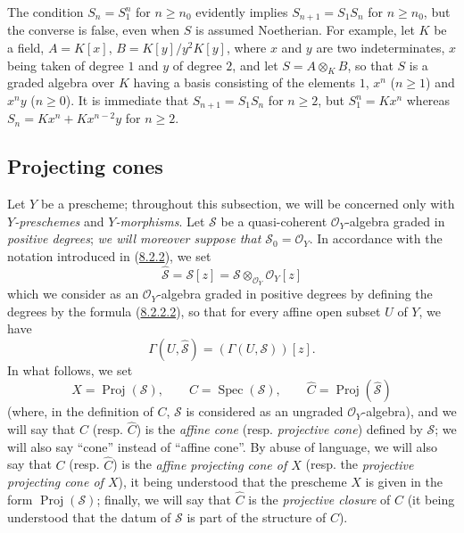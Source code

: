 \begin{remark}[8.2.15]
\label{II.8.2.15}
The condition $S_n=S_1^n$ for $n\geq n_0$ evidently implies
$S_{n+1}=S_1S_n$ for $n\geq n_0$, but the converse is false, even
when $S$ is assumed Noetherian. For example, let $K$ be a field,
$A=K[x]$, $B=K[y]/y^2K[y]$, where $x$ and $y$ are two indeterminates, $x$ being
taken of degree $1$ and $y$ of degree $2$, and let $S=A\otimes_KB$, so that
$S$ is a graded algebra over $K$ having a basis consisting of the elements $1$,
$x^n$ ($n\geq1$) and $x^ny$ ($n\geq0$). It is immediate that
$S_{n+1}=S_1S_n$ for $n\geq2$, but $S_1^n=Kx^n$ whereas
$S_n=Kx^n+Kx^{n-2}y$ for $n\geq2$.
\end{remark}

\subsection{Projecting cones}
\label{subsection:II.8.3}

\begin{env}[8.3.1]
\label{II.8.3.1}
Let $Y$ be a prescheme; throughout this subsection, we will be concerned only
with \emph{$Y$-preschemes} and \emph{$Y$-morphisms}. Let $\mathcal{S}$ be a
quasi-coherent $\mathcal{O}_Y$-algebra graded in \emph{positive degrees};
\emph{we will moreover suppose that $\mathcal{S}_0=\mathcal{O}_Y$}.
In accordance with the notation introduced in
(\hyperref[II.8.2.2]{8.2.2}), we set
\begin{equation}
\label{II.8.3.1.1}
  \widehat{\mathcal{S}}=\mathcal{S}[z]
  =\mathcal{S}\otimes_{\mathcal{O}_Y}\mathcal{O}_Y[z]
\tag{8.3.1.1}
\end{equation}
which we consider as an $\mathcal{O}_Y$-algebra graded in positive degrees by
defining the degrees by the formula
(\hyperref[II.8.2.2.2]{8.2.2.2}), so that for every affine open subset $U$
of $Y$, we have
\[
  \Gamma(U,\widehat{\mathcal{S}})=(\Gamma(U,\mathcal{S}))[z].
\]
In what follows, we set
\begin{equation}
\label{II.8.3.1.2}
  X=\operatorname{Proj}(\mathcal{S}),\qquad
  C=\operatorname{Spec}(\mathcal{S}),\qquad
  \widehat{C}=\operatorname{Proj}(\widehat{\mathcal{S}})
\tag{8.3.1.2}
\end{equation}
(where, in the definition of $C$, $\mathcal{S}$ is considered as an ungraded
$\mathcal{O}_Y$-algebra), and we will say that $C$ (resp.
$\widehat{C}$) is the \emph{affine cone} (resp. \emph{projective cone}) defined
by $\mathcal{S}$; we will also say ``cone'' instead of ``affine cone''. By
abuse of language, we will also say that $C$ (resp. $\widehat{C}$) is the
\emph{affine projecting cone of $X$} (resp. the \emph{projective projecting
cone of $X$}), it being understood that the prescheme $X$ is given in the form
$\operatorname{Proj}(\mathcal{S})$; finally, we will say that $\widehat{C}$ is
the \emph{projective closure} of $C$ (it being understood that the datum of
$\mathcal{S}$ is part of the structure of $C$).
\end{env}

